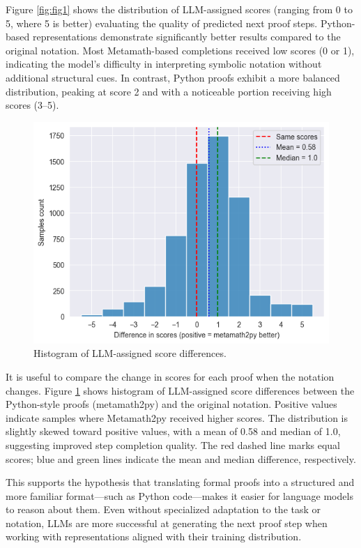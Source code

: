 Figure \ref{fig:fig1} shows the distribution of LLM-assigned scores (ranging from 0 to 5, where 5 is better)
evaluating
the
quality of
predicted next proof steps. Python-based representations demonstrate significantly better results compared to the original notation. Most Metamath-based completions received low scores (0 or 1), indicating the model's difficulty in interpreting symbolic notation without additional structural cues. In contrast, Python proofs exhibit a more balanced distribution, peaking at score 2 and with a noticeable portion receiving high scores (3–5).


\begin{figure}[H]
  \centering
  \includegraphics[scale=0.5]{scores_diff.png}
  \caption{Histogram of LLM-assigned score differences.}
  \label{fig:fig2}
\end{figure}


It is useful to compare the change in scores for each proof when the notation changes. Figure \ref{fig:fig2} shows
histogram of
LLM-assigned score differences between the Python-style proofs (metamath2py) and the
original notation. Positive values indicate samples where Metamath2py received higher scores. The
distribution is slightly skewed toward positive values, with a mean of 0.58 and median of 1.0, suggesting improved
step completion quality. The red dashed line marks equal scores; blue and green lines indicate
the mean and median difference, respectively.


This supports the hypothesis that translating formal proofs into a structured and more familiar format—such as Python code—makes it easier for language models to reason about them. Even without specialized adaptation to the task or notation, LLMs are more successful at generating the next proof step when working with representations aligned with their training distribution.



